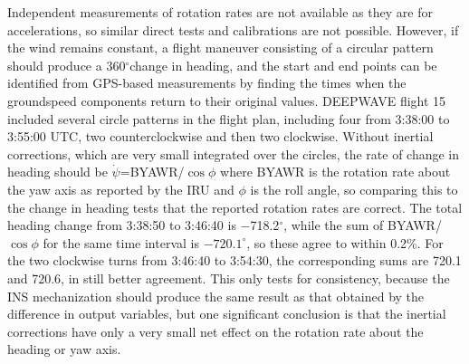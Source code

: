 \documentclass[12pt,twoside,english,12pt,twoside,english]{article}\usepackage[]{graphicx}\usepackage[]{color}
\let\OrgIndex\index
\renewcommand*{\index}[1]{\OrgIndex{#1}}
\begin{document}
Independent measurements
of rotation rates are not available as
they are for accelerations, so similar direct tests and calibrations
are not possible. However, if the wind remains constant, a flight
maneuver consisting of a circular pattern
should produce a 360$^{\circ}$change in heading, and the start and
end points can be identified from GPS-based
measurements by finding the times when the groundspeed components
return to their original values. DEEPWAVE
flight 15 included several circle patterns
in the flight plan, including four from 3:38:00 to 3:55:00 UTC, two
counterclockwise and then two clockwise. Without inertial corrections,
which are very small integrated over the circles, the rate of change
in heading
should be $\dot{\psi}$=BYAWR/$\cos\phi$ where BYAWR is the rotation
rate about the yaw axis as reported by the IRU and $\phi$ is the
roll angle, so comparing this to the change in heading tests that
the reported rotation rates are correct. The total heading change
from 3:38:50 to 3:46:40 is $-$718.2$^{\circ}$, while the sum of
BYAWR/$\cos\phi$ for the same time interval is $-720.1^{\circ}$,
so these agree to within 0.2\%. For the two clockwise turns from 3:46:40
to 3:54:30, the corresponding sums are 720.1 and 720.6, in still better
agreement. This only tests for consistency, because the INS
mechanization should produce the same result as that obtained by the
difference in output variables, but one significant conclusion is
that the inertial corrections have only
a very small net effect on the rotation rate about the heading or
yaw axis. 
\end{document}
